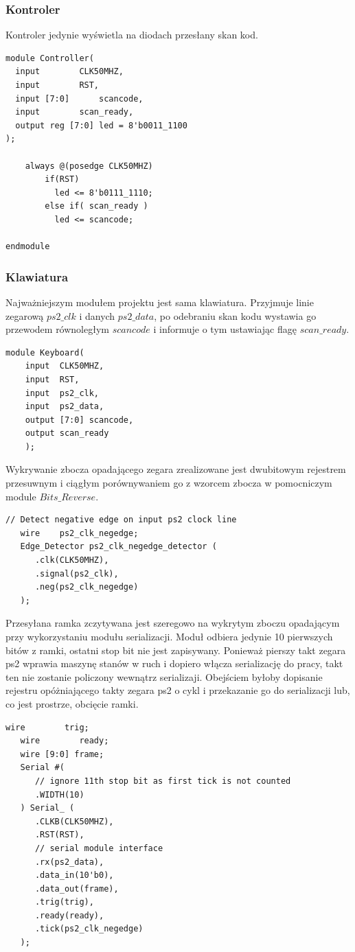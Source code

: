 \documentclass[a4paper,12pt]{article}
\begin{document}
\subsubsection{Kontroler}
Kontroler jedynie wyświetla na diodach przesłany skan kod.
\begin{lstlisting}[label=Controller,caption=Controller.v]
module Controller(
  input 	   CLK50MHZ,
  input 	   RST,
  input [7:0] 	   scancode,
  input 	   scan_ready,
  output reg [7:0] led = 8'b0011_1100
);

    always @(posedge CLK50MHZ)
        if(RST)
          led <= 8'b0111_1110;
        else if( scan_ready )
          led <= scancode;

endmodule
\end{lstlisting}

\subsubsection{Klawiatura}
Najważniejszym modułem projektu jest sama klawiatura. Przyjmuje linie zegarową $ps2\_clk$ i danych $ps2\_data$, po odebraniu skan kodu wystawia go przewodem równoległym $scancode$ i informuje o tym ustawiając flagę $scan\_ready$.
\begin{lstlisting}[label=Keyboard,caption=Keyboard.v]
module Keyboard(
    input  CLK50MHZ,
    input  RST,
    input  ps2_clk,
    input  ps2_data,
    output [7:0] scancode,
    output scan_ready
    );
\end{lstlisting}

Wykrywanie zbocza opadającego zegara zrealizowane jest dwubitowym rejestrem przesuwnym i ciągłym porównywaniem go z wzorcem zbocza w pomocniczym module $Bits\_Reverse$.
\begin{lstlisting}[label=Keyboard,caption=Keyboard.v,firstnumber=10]
   // Detect negative edge on input ps2 clock line
   wire    ps2_clk_negedge;
   Edge_Detector ps2_clk_negedge_detector (
      .clk(CLK50MHZ),
      .signal(ps2_clk),
      .neg(ps2_clk_negedge)
   );
\end{lstlisting}

Przesyłana ramka zczytywana jest szeregowo na wykrytym zboczu opadającym przy wykorzystaniu modułu serializacji. Moduł odbiera jedynie 10 pierwszych bitów z ramki, ostatni stop bit nie jest zapisywany. Ponieważ pierszy takt zegara ps2 wprawia maszynę stanów w ruch i dopiero włącza serializację do pracy, takt ten nie zostanie policzony wewnątrz serializaji. Obejściem byłoby dopisanie rejestru opóżniającego takty zegara ps2 o cykl i przekazanie go do serializacji lub, co jest prostrze, obcięcie ramki.
\begin{lstlisting}[label=Keyboard,caption=Keyboard.v,firstnumber=18]
   wire        trig;
   wire        ready;
   wire [9:0] frame;
   Serial #(
      // ignore 11th stop bit as first tick is not counted
      .WIDTH(10)
   ) Serial_ (
      .CLKB(CLK50MHZ),
      .RST(RST),
      // serial module interface
      .rx(ps2_data),
      .data_in(10'b0),
      .data_out(frame),
      .trig(trig),
      .ready(ready),
      .tick(ps2_clk_negedge)
   );
\end{lstlisting}
\end{document}
